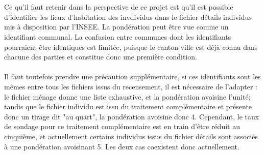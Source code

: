 \documentclass{bredele}
\begin{document}
\\\\Ce qu'il faut retenir dans la perspective de ce projet est qu'il est possible d'identifier les lieux d'habitation des invdividus dans le fichier détails individus mis à disposition par l'INSEE. La pondération peut être vue comme un identifiant communal. La confusion entre communes dont les identifiants pourraient être identiques est limitée, puisque le canton-ville est déjà connu dans chacune des parties et constitue donc une première condition.
\\\\Il faut toutefois prendre une précaution supplémentaire, si ces identifiants sont les mêmes entre tous les fichiers issus du recensement, il est nécessaire de l'adapter : le fichier ménage donne une liste exhaustive, et la pondération avoisine l'unité; tandis que le fichier individu est issu du traitement complémentaire et présente donc un tirage dit "au quart", la pondération avoisine donc 4. Cependant, le taux de sondage pour ce traitement complémentaire est en train d'être réduit au cinquième, et actuellement certains individus issus du fichier détails sont associés à une pondération avoisinant 5. Les deux cas coexistent donc actuellement.
\newline
{}
\end{document}
